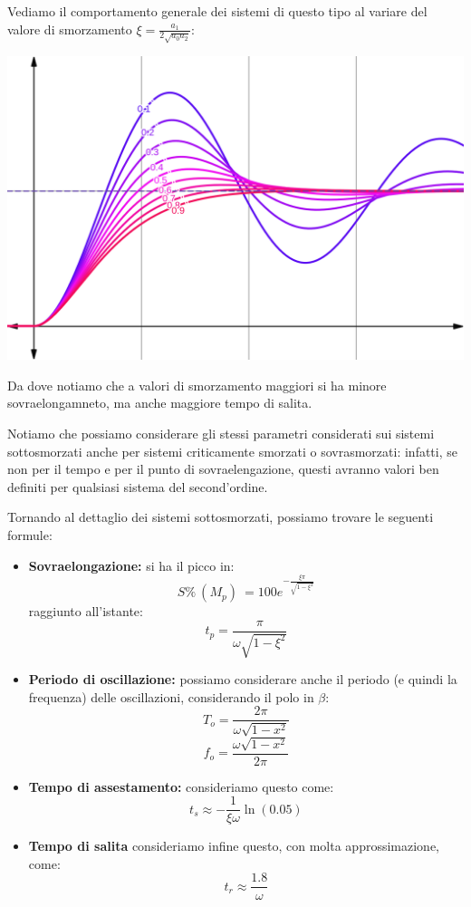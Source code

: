 \documentclass[a4paper,11pt]{article}
\begin{document}
\noindent
\begin{minipage}{\textwidth}
Vediamo il comportamento generale dei sistemi di questo tipo al variare del valore di smorzamento $\xi = \frac{a_1}{2 \sqrt{a_0 a_2}}$:

\par\bigskip

\begin{center}
\includegraphics[scale=0.29]{../figures/damping_values.png}
\end{center}
\end{minipage}

\par\bigskip

Da dove notiamo che a valori di smorzamento maggiori si ha minore sovraelongamneto, ma anche maggiore tempo di salita.

Notiamo che possiamo considerare gli stessi parametri considerati sui sistemi sottosmorzati anche per sistemi criticamente smorzati o sovrasmorzati: infatti, se non per il tempo e per il punto di sovraelengazione, questi avranno valori ben definiti per qualsiasi sistema del second'ordine.

Tornando al dettaglio dei sistemi sottosmorzati, possiamo trovare le seguenti formule:
\begin{itemize}
	\item \textbf{Sovraelongazione:} si ha il picco in:
		$$
			S\% \ (M_p) \ = 100 e^{- \frac{\xi \pi}{\sqrt{1 - \xi^2}}}
		$$
		raggiunto all'istante:
		$$
			t_p = \frac{\pi}{\omega \sqrt{1 - \xi^2}}
		$$
	\item \textbf{Periodo di oscillazione:} possiamo considerare anche il periodo (e quindi la frequenza) delle oscillazioni, considerando il polo in $\beta$:
		$$
			T_o = \frac{2\pi}{\omega \sqrt{1 - x^2}}
		$$
		$$
			f_o = \frac{\omega \sqrt{1 - x^2}}{2\pi} 
		$$
	\item \textbf{Tempo di assestamento:} consideriamo questo come:
		$$
		t_s \approx -\frac{1}{\xi \omega} \ln(0.05)
		$$
	\item \textbf{Tempo di salita} consideriamo infine questo, con molta approssimazione, come:
		$$
		t_r \approx \frac{1.8}{\omega}
		$$
\end{itemize}
\end{document}

